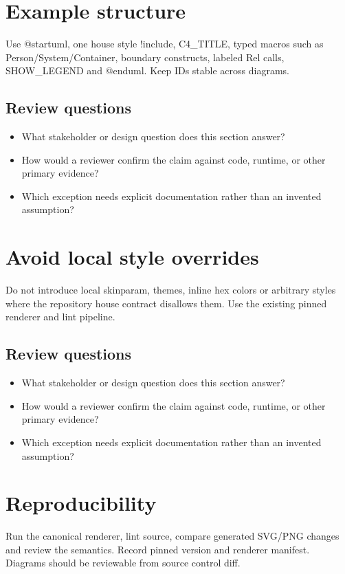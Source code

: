\documentclass[10pt,letterpaper]{article}
\begin{document}
\section{Example structure}
Use @startuml, one house style !include, C4\_TITLE, typed macros such as Person/System/Container, boundary constructs, labeled Rel calls, SHOW\_LEGEND and @enduml. Keep IDs stable across diagrams.


\subsection{Review questions}
\begin{itemize}
\item What stakeholder or design question does this section answer?
\item How would a reviewer confirm the claim against code, runtime, or other primary evidence?
\item Which exception needs explicit documentation rather than an invented assumption?
\end{itemize}

\section{Avoid local style overrides}
Do not introduce local skinparam, themes, inline hex colors or arbitrary styles where the repository house contract disallows them. Use the existing pinned renderer and lint pipeline.


\subsection{Review questions}
\begin{itemize}
\item What stakeholder or design question does this section answer?
\item How would a reviewer confirm the claim against code, runtime, or other primary evidence?
\item Which exception needs explicit documentation rather than an invented assumption?
\end{itemize}

\section{Reproducibility}
Run the canonical renderer, lint source, compare generated SVG/PNG changes and review the semantics. Record pinned version and renderer manifest. Diagrams should be reviewable from source control diff.
\end{document}
